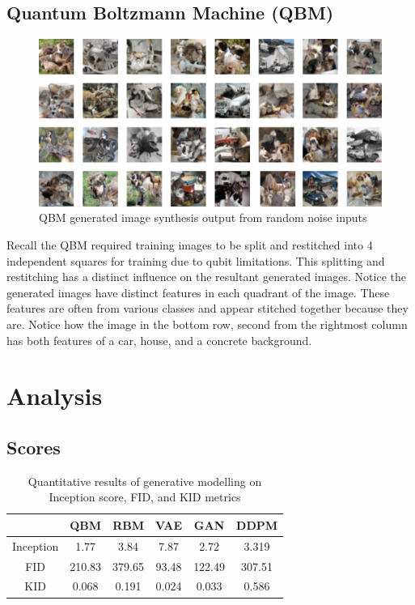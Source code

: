 \documentclass[%
 reprint,
 amsmath,amssymb,
 aps,
]{revtex4-2}
\begin{document}
\subsection{Quantum Boltzmann Machine (QBM)}
\label{qbm_result_}

\begin{figure}[h]
    \includegraphics[width=0.9\columnwidth]{qbmout.png}
    \caption{\label{fig:qbmresults} QBM generated image synthesis output from random noise inputs}
\end{figure}


Recall the QBM required training images to be split and restitched into 4 independent squares for training due to qubit limitations. This splitting and restitching has a distinct influence on the resultant generated images. Notice the generated images have distinct features in each quadrant of the image. These features are often from various classes and appear stitched together because they are. Notice how the image in the bottom row, second from the rightmost column has both features of a car, house, and a concrete background.


\section{Analysis}
\subsection{Scores}

\begin{table}[h]
\caption{\label{tab: results}Quantitative results of generative modelling on Inception score, FID, and KID metrics}
\begin{ruledtabular}
\begin{tabular}{ cccccc }
  & QBM & RBM & VAE & GAN & DDPM\\ \hline 
 Inception& 1.77 &3.84& 7.87& 2.72 & 3.319\\ 
 FID& 210.83&379.65 & 93.48 & 122.49 & 307.51\\ 
 KID&0.068&0.191 & 0.024 & 0.033 & 0.586 \\ 
\end{tabular}
\end{ruledtabular}
\end{table}
\end{document}
